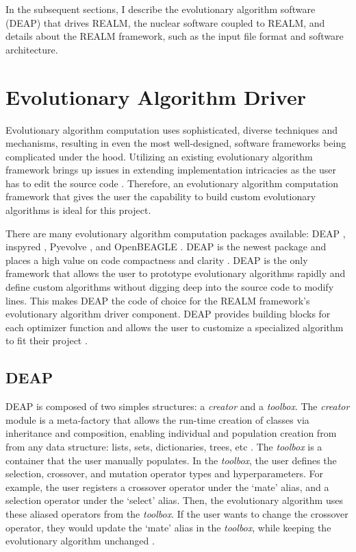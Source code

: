In the subsequent sections, I describe the evolutionary algorithm software (DEAP)
that drives \gls{REALM}, the nuclear software coupled to REALM, and details about 
the \gls{REALM} framework, such as the input file format and software architecture. 

\section{Evolutionary Algorithm Driver}
Evolutionary algorithm computation uses sophisticated, diverse techniques 
and mechanisms, resulting in even the most well-designed, software frameworks 
being complicated under the hood. 
Utilizing an existing evolutionary algorithm framework brings 
up issues in extending implementation intricacies as the user has to edit the 
source code \cite{fortin_deap_2012}. 
Therefore, an evolutionary algorithm computation framework that gives the user the 
capability to build custom evolutionary algorithms is ideal for this project.

There are many evolutionary algorithm computation packages available: 
\gls{DEAP} \cite{fortin_deap_2012}, inspyred \cite{garrett_inspyred_2014}, 
Pyevolve \cite{perone_pyevolve_2009}, and OpenBEAGLE \cite{gagne_open_2002}.
\gls{DEAP} is the newest package and places a high value on code 
compactness and clarity \cite{fortin_deap_2012}. 
\gls{DEAP} is the only framework that allows the user to prototype evolutionary 
algorithms rapidly and define custom algorithms without digging deep into 
the source code to modify lines.
This makes \gls{DEAP} the code of choice for the REALM framework's evolutionary 
algorithm driver component. 
\gls{DEAP} provides building blocks for each optimizer function and allows the 
user to customize a specialized algorithm to fit their project \cite{fortin_deap_2012}.

\subsection{\acrlong{DEAP}}
\label{sec:deap-works}
\gls{DEAP} is composed of two simples structures: a \textit{creator} and a 
\textit{toolbox}.  
The \textit{creator} module is a meta-factory that allows the run-time creation 
of classes via inheritance and composition, enabling individual and population 
creation from  from any data structure: lists, sets, dictionaries, trees, 
etc \cite{fortin_deap_2012}. 
The \textit{toolbox} is a container that the user manually populates.
In the \textit{toolbox}, the user defines the selection, crossover, and 
mutation operator types and hyperparameters. 
For example, the user registers a crossover operator under the `mate'
alias, and a selection operator under the `select' alias. 
Then, the evolutionary algorithm uses these aliased operators from the 
\textit{toolbox}. 
If the user wants to change the crossover operator, they would update the 
`mate' alias in the \textit{toolbox}, while keeping the evolutionary algorithm 
unchanged \cite{fortin_deap_2012}. 

